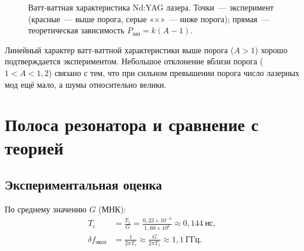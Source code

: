 \documentclass[12pt,a4paper]{article}
\begin{document}
\begin{figure}[H]
  \centering
  \caption{Ватт-ваттная характеристика Nd:YAG лазера.
  Точки~--- эксперимент (красные~--- выше порога, серые «$\times$»~--- ниже порога);
  прямая~--- теоретическая зависимость $P_\text{лаз} = k(A-1)$.}
  \label{fig:WW}
\end{figure}

Линейный характер ватт-ваттной характеристики выше порога ($A>1$)
хорошо подтверждается экспериментом. Небольшое отклонение вблизи порога
($1 < A < 1{,}2$) связано с тем, что при сильном превышении порога
число лазерных мод ещё мало, а шумы относительно велики.

\section{Полоса резонатора и сравнение с теорией}

\subsection{Экспериментальная оценка}

По среднему значению $G$ (МНК):
\begin{align}
  T_c &= \frac{T_1}{G} = \frac{0{,}23\times10^{-3}}{1{,}60\times10^6}
        \approx 0{,}144~\text{нс}, \label{eq:Tc}\\
  \delta f_\text{эксп} &= \frac{1}{2\pi T_c} \approx \frac{G}{2\pi T_1}
        \approx 1{,}1~\text{ГГц}. \label{eq:deltaf_exp}
\end{align}
\end{document}
